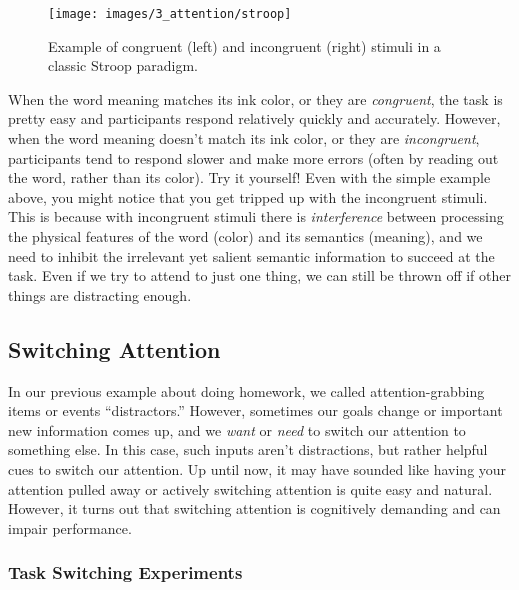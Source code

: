 \documentclass[
]{krantz}
\begin{document}
\begin{figure}

{\centering \texttt{[image: images/3\_attention/stroop]} 

}

\caption{Example of congruent (left) and incongruent (right) stimuli in a classic Stroop paradigm.}\label{fig:stroop}
\end{figure}

When the word meaning matches its ink color, or they are \emph{congruent}, the task is pretty easy and participants respond relatively quickly and accurately. However, when the word meaning doesn't match its ink color, or they are \emph{incongruent}, participants tend to respond slower and make more errors (often by reading out the word, rather than its color). Try it yourself! Even with the simple example above, you might notice that you get tripped up with the incongruent stimuli. This is because with incongruent stimuli there is \emph{interference} between processing the physical features of the word (color) and its semantics (meaning), and we need to inhibit the irrelevant yet salient semantic information to succeed at the task. Even if we try to attend to just one thing, we can still be thrown off if other things are distracting enough.

\subsection*{Switching Attention}\label{switching-attention}


In our previous example about doing homework, we called attention-grabbing items or events ``distractors.'' However, sometimes our goals change or important new information comes up, and we \emph{want} or \emph{need} to switch our attention to something else. In this case, such inputs aren't distractions, but rather helpful cues to switch our attention. Up until now, it may have sounded like having your attention pulled away or actively switching attention is quite easy and natural. However, it turns out that switching attention is cognitively demanding and can impair performance.

\subsubsection*{Task Switching Experiments}\label{task-switching-experiments}
\end{document}
